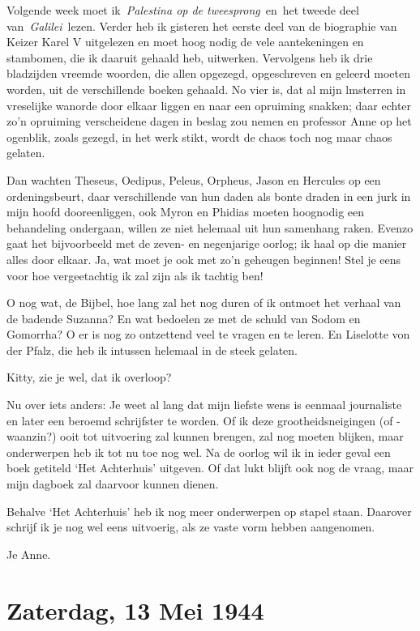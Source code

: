 \documentclass{book}
\begin{document}
Volgende week moet ik~\emph{Palestina op de tweesprong}~en~het tweede
deel van~\emph{Galilei}~lezen. Verder heb ik gisteren het eerste deel
van de biographie van Keizer Karel V uitgelezen en moet hoog nodig de
vele aantekeningen en stambomen, die ik daaruit gehaald heb, uitwerken.
Vervolgens heb ik drie bladzijden vreemde woorden, die allen opgezegd,
opgeschreven en geleerd moeten worden, uit de verschillende boeken
gehaald. No vier is, dat al mijn lmsterren in vreselijke wanorde door
elkaar liggen en naar een opruiming snakken; daar echter zo'n opruiming
verscheidene dagen in beslag zou nemen en professor Anne op het
ogenblik, zoals gezegd, in het werk stikt, wordt de chaos toch nog maar
chaos gelaten.

Dan wachten Theseus, Oedipus, Peleus, Orpheus, Jason en Hercules op een
ordeningsbeurt, daar verschillende van hun daden als bonte draden in een
jurk in mijn hoofd dooreenliggen, ook Myron en Phidias moeten hoognodig
een behandeling ondergaan, willen ze niet helemaal uit hun samenhang
raken. Evenzo gaat het bijvoorbeeld met de zeven- en negenjarige oorlog;
ik haal op die manier alles door elkaar. Ja, wat moet je ook met zo'n
geheugen beginnen! Stel je eens voor hoe vergeetachtig ik zal zijn als
ik tachtig ben!

O nog wat, de Bijbel, hoe lang zal het nog duren of ik ontmoet het
verhaal van de badende Suzanna? En wat bedoelen ze met de schuld van
Sodom en Gomorrha? O er is nog zo ontzettend veel te vragen en te leren.
En Liselotte von der Pfalz, die heb ik intussen helemaal in de steek
gelaten.

Kitty, zie je wel, dat ik overloop?

Nu over iets anders: Je weet al lang dat mijn liefste wens is eenmaal
journaliste en later een beroemd schrijfster te worden. Of ik deze
grootheidsneigingen (of - waanzin?) ooit tot uitvoering zal kunnen
brengen, zal nog moeten blijken, maar onderwerpen heb ik tot nu toe nog
wel. Na de oorlog wil ik in ieder geval een boek getiteld `Het
Achterhuis' uitgeven. Of dat lukt blijft ook nog de vraag, maar mijn
dagboek zal daarvoor kunnen dienen.

Behalve `Het Achterhuis' heb ik nog meer onderwerpen op stapel staan.
Daarover schrijf ik je nog wel eens uitvoerig, als ze vaste vorm hebben
aangenomen.

Je Anne.

\chapter{Zaterdag, 13 Mei 1944}
\end{document}
